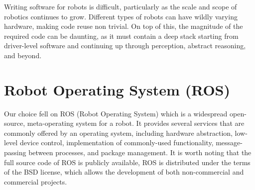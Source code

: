 Writing software for robots is difficult, particularly as the scale and scope
of robotics continues to grow. Different types of robots can have wildly varying
hardware, making code reuse non trivial. On top of this, the magnitude of
the required code can be daunting, as it must contain a deep stack starting
from driver-level software and continuing up through perception, abstract
reasoning, and beyond.

\section{Robot Operating System (ROS)}
Our choice fell on ROS (Robot Operating System) which is a widespread
open-source, meta-operating system for a robot. It provides several services
that are commonly offered by an operating system, including hardware
abstraction, low-level device control, implementation of commonly-used functionality,
message-passing between processes, and package management. It is
worth noting that the full source code of ROS is publicly available, ROS is
distributed under the terms of the BSD license, which allows the development
of both non-commercial and commercial projects.

